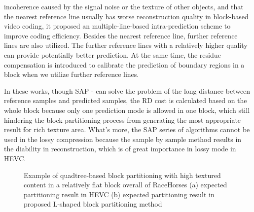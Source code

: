 \documentclass[journal]{IEEEtran}
\begin{document}
incoherence caused by the signal noise or the texture of other objects, and that the nearest reference line usually has worse reconstruction quality in block-based video coding, it proposed an multiple-line-based intra-prediction scheme to improve coding efficiency. Besides the nearest reference line, further reference lines are also utilized. The further reference lines with a relatively higher quality can provide potentially better prediction. At the same time, the residue compensation is introduced to calibrate the prediction of boundary regions in a block when we utilize further reference lines.

In these works, though SAP \cite{09}-\cite{12} can solve the problem of the long distance between reference samples and predicted samples, the RD cost is calculated based on the whole block because only one prediction mode is allowed in one block, which still hindering the block partitioning process from generating the most appropriate result for rich texture area. What's more, the SAP series of algorithms cannot be used in the lossy compression because the sample by sample method results in the diability in reconstruction, which is of great importance in lossy mode in HEVC.

\begin{figure}[tp]
    \centering
    \caption{Example of quadtree-based block partitioning with high textured content in a relatively flat block overall of RaceHorses (a) expected partitioning result in HEVC (b) expected partitioning result in proposed L-shaped block partitioning method}
    \label{fig:l-shaped block}
\end{figure}
\end{document}
